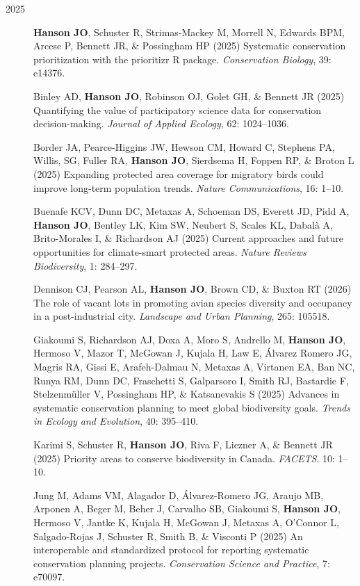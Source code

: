 \documentclass[12pt,a4paper]{article}
\begin{document}
\begin{description}
\item[2025] \textbf{Hanson JO}, Schuster R, Strimas‐Mackey M, Morrell N, Edwards BPM, Arcese P, Bennett JR, \& Possingham HP (2025) Systematic conservation prioritization with the prioritizr R package. \textit{Conservation Biology}, 39: e14376.

\item[] Binley AD, \textbf{Hanson JO}, Robinson OJ, Golet GH, \& Bennett JR (2025) Quantifying the value of participatory science data for conservation decision-making. \textit{Journal of Applied Ecology}, 62: 1024--1036.

\item[] Border JA, Pearce-Higgins JW, Hewson CM, Howard C, Stephens PA, Willis, SG, Fuller RA, \textbf{Hanson JO}, Sierdsema H, Foppen RP, \& Broton L (2025) Expanding protected area coverage for migratory birds could improve long-term population trends. \textit{Nature Communications}, 16: 1--10.

\item[] Buenafe KCV, Dunn DC, Metaxas A, Schoeman DS, Everett JD, Pidd A, \textbf{Hanson JO}, Bentley LK, Kim SW, Neubert S, Scales KL, Dabalà A, Brito-Morales I, \& Richardson AJ (2025) Current approaches and future opportunities for climate-smart protected areas. \textit{Nature Reviews Biodiversity}, 1: 284--297.

\item[] Dennison CJ, Pearson AL, \textbf{Hanson JO}, Brown CD, \& Buxton RT (2026) The role of vacant lots in promoting avian species diversity and occupancy in a post-industrial city. \textit{Landscape and Urban Planning}, 265: 105518.

\item[] Giakoumi S, Richardson AJ, Doxa A, Moro S, Andrello M, \textbf{Hanson JO}, Hermoso V, Mazor T, McGowan J, Kujala H, Law E, Álvarez Romero JG, Magris RA, Gissi E, Arafeh-Dalmau N, Metaxas A, Virtanen EA, Ban NC, Runya RM, Dunn DC, Fraschetti S, Galparsoro I, Smith RJ, Bastardie F, Stelzenmüller V, Possingham HP, \& Katsanevakis S (2025) Advances in systematic conservation planning to meet global biodiversity goals. \textit{Trends in Ecology and Evolution}, 40: 395--410.

\item[] Karimi S, Schuster R, \textbf{Hanson JO}, Riva F, Liczner A, \& Bennett JR (2025) Priority areas to conserve biodiversity in Canada. \textit{FACETS}. 10: 1--10.

\item[] Jung M, Adams VM, Alagador D, Álvarez-Romero JG, Araujo MB, Arponen A, Beger M, Beher J, Carvalho SB, Giakoumi S, \textbf{Hanson JO}, Hermoso V, Jantke K, Kujala H, McGowan J, Metaxas A, O'Connor L, Salgado-Rojas J, Schuster R, Smith B, \& Visconti P (2025) An interoperable and standardized protocol for reporting systematic conservation planning projects. \textit{Conservation Science and Practice}, 7: e70097.


\end{description}
\end{document}
